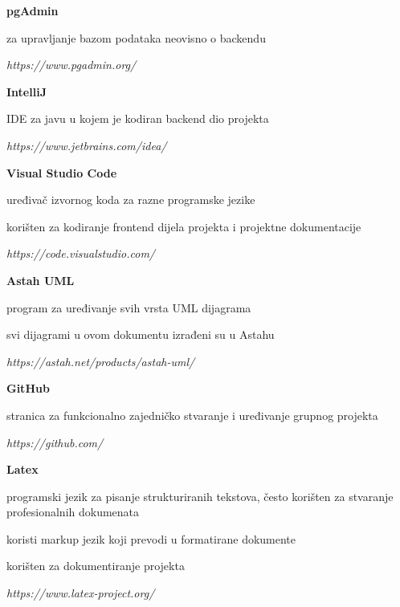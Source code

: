 \begin{packed_item}
				\item \textbf{pgAdmin}
				\begin{packed_item}
					\item za upravljanje bazom podataka neovisno o backendu 
					\item \textit{ https://www.pgadmin.org/}
				\end{packed_item}

				\item \textbf{IntelliJ }
				\begin{packed_item}
					\item  IDE za javu u kojem je kodiran backend dio projekta 
					\item \textit{ https://www.jetbrains.com/idea/}
				\end{packed_item}

				\item \textbf{Visual Studio Code}
				\begin{packed_item}
					\item  uređivač izvornog koda za razne programske jezike
					\item  korišten za kodiranje frontend dijela projekta i projektne dokumentacije
					\item \textit{ https://code.visualstudio.com/}
				\end{packed_item}

				\item \textbf{Astah UML }
				\begin{packed_item}
					\item program za uređivanje svih vrsta UML dijagrama
					\item svi dijagrami u ovom dokumentu izrađeni su u Astahu 
					\item \textit{https://astah.net/products/astah-uml/}
				\end{packed_item}

				\item \textbf{GitHub }
				\begin{packed_item}
					\item  stranica za funkcionalno zajedničko stvaranje i uređivanje grupnog projekta 
					\item \textit{https://github.com/}
				\end{packed_item}

				\item \textbf{Latex}
				\begin{packed_item}
					\item programski jezik za pisanje strukturiranih tekstova, često korišten za stvaranje profesionalnih dokumenata
					\item koristi markup jezik koji prevodi u formatirane dokumente
					\item korišten za dokumentiranje projekta
					\item \textit{https://www.latex-project.org/}
				\end{packed_item}
				

\end{packed_item}
